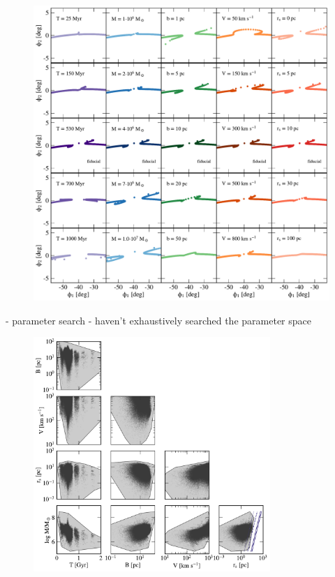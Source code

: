 \documentclass[12pt, modern]{aastex62}
\begin{document}
\begin{figure}
\begin{center}
\includegraphics[width=\textwidth]{excursions.pdf}
\end{center}
\caption{}
\label{fig:scalings}
\end{figure}

- parameter search
- haven't exhaustively searched the parameter space

\begin{figure}
\begin{center}
\includegraphics[width=0.8\textwidth]{corner.pdf}
\end{center}
\caption{}
\label{fig:corner}
\end{figure}
\end{document}
